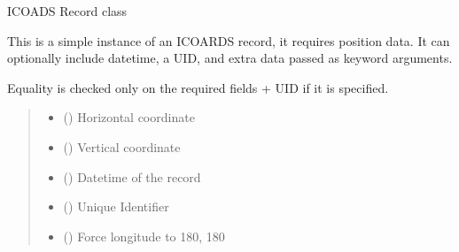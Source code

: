 \documentclass[letterpaper,10pt,english]{sphinxmanual}
\begin{document}
\begin{fulllineitems}
\label{\detokenize{users_guide:GeoSpatialTools.quadtree.Record}}
\pysigstartsignatures
{}
\pysigstopsignatures
\sphinxAtStartPar
ICOADS Record class

\sphinxAtStartPar
This is a simple instance of an ICOARDS record, it requires position data.
It can optionally include datetime, a UID, and extra data passed as
keyword arguments.

\sphinxAtStartPar
Equality is checked only on the required fields + UID if it is specified.
\begin{quote}\begin{description}
\begin{itemize}
\item {} 
\sphinxAtStartPar
{} () \textendash{} Horizontal coordinate

\item {} 
\sphinxAtStartPar
{} () \textendash{} Vertical coordinate

\item {} 
\sphinxAtStartPar
{} (\sphinxstyleliteralemphasis{\sphinxupquote{ | }}) \textendash{} Datetime of the record

\item {} 
\sphinxAtStartPar
{} (\sphinxstyleliteralemphasis{\sphinxupquote{ | }}) \textendash{} Unique Identifier

\item {} 
\sphinxAtStartPar
{} () \textendash{} Force longitude to \sphinxhyphen{}180, 180


\end{itemize}
\end{description}
\end{quote}
\end{fulllineitems}
\end{document}
